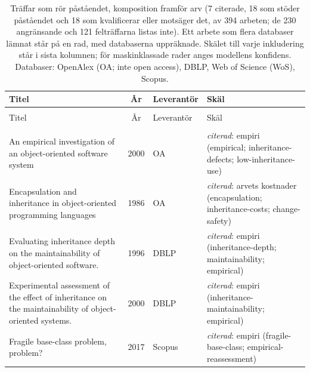 
\begingroup\footnotesize
\begin{longtable}{@{}%
  >{\raggedright\arraybackslash}p{}c%
  >{\raggedright\arraybackslash}p{}%
  >{\raggedright\arraybackslash}p{}@{}}
\caption{Träffar som rör påståendet, komposition framför arv (7 citerade, 18 som stöder påståendet och 18 som kvalificerar eller motsäger det, av 394 arbeten; de 230 angränsande och 121 felträffarna listas inte).  Ett arbete som flera databaser lämnat står på en rad, med databaserna uppräknade. Skälet till varje inkludering står i sista kolumnen; för maskinklassade rader anges modellens konfidens. Databaser: OpenAlex (OA; inte open access), DBLP, Web of Science (WoS), Scopus.}\label{tab:sok-komposition}\\
\toprule
Titel & År & Leverantör & Skäl \\
\midrule
\endfirsthead
\multicolumn{4}{@{}l}{\emph{\tablename~\thetable{} (\GetTranslation{continued})}}\\
\toprule
Titel & År & Leverantör & Skäl \\
\midrule
\endhead
\midrule \multicolumn{4}{r@{}}{\emph{\GetTranslation{continued on the next page}}}\\
\endfoot
\bottomrule
\endlastfoot
An empirical investigation of an object-oriented software system & 2000 & OA & \emph{citerad}: empiri (empirical; inheritance-defects; low-inheritance-use) \\
Encapsulation and inheritance in object-oriented programming languages & 1986 & OA & \emph{citerad}: arvets kostnader (encapsulation; inheritance-costs; change-safety) \\
Evaluating inheritance depth on the maintainability of object-oriented software. & 1996 & DBLP & \emph{citerad}: empiri (inheritance-depth; maintainability; empirical) \\
Experimental assessment of the effect of inheritance on the maintainability of object-oriented systems. & 2000 & DBLP & \emph{citerad}: empiri (inheritance-maintainability; empirical) \\
Fragile base-class problem, problem? & 2017 & Scopus & \emph{citerad}: empiri (fragile-base-class; empirical-reassessment) \\

\end{longtable}
